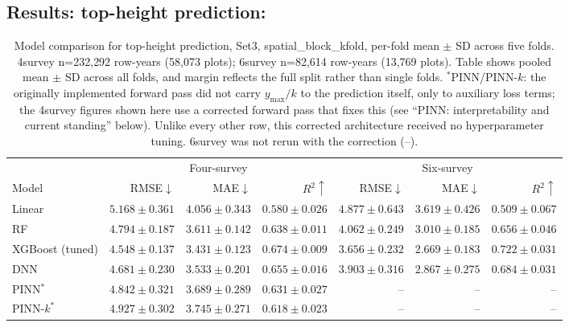 \documentclass[logo,msc,ai]{infthesis}           %
\begin{document}
\subsection{Results: top-height prediction:}
\begin{table}[!htbp]
\centering
\scriptsize
\setlength{\tabcolsep}{4pt}
\renewcommand{\arraystretch}{1.2}
\begin{tabular}{lrrrrrr}
\toprule
& \multicolumn{3}{c}{Four-survey} & \multicolumn{3}{c}{Six-survey} \\
\cmidrule(lr){2-4} \cmidrule(lr){5-7}
Model & RMSE${\downarrow}$ & MAE${\downarrow}$ & $R^2{\uparrow}$ & RMSE${\downarrow}$ & MAE${\downarrow}$ & $R^2{\uparrow}$ \\
\midrule
Linear & $5.168{\pm}0.361$ & $4.056{\pm}0.343$ & $0.580{\pm}0.026$ & $4.877{\pm}0.643$ & $3.619{\pm}0.426$ & $0.509{\pm}0.067$ \\
RF & $4.794{\pm}0.187$ & $3.611{\pm}0.142$ & $0.638{\pm}0.011$ & $4.062{\pm}0.249$ & $3.010{\pm}0.185$ & $0.656{\pm}0.046$ \\
XGBoost (tuned) & $\mathbf{4.548{\pm}0.137}$ & $\mathbf{3.431{\pm}0.123}$ & $\mathbf{0.674{\pm}0.009}$ & $\mathbf{3.656{\pm}0.232}$ & $\mathbf{2.669{\pm}0.183}$ & $\mathbf{0.722{\pm}0.031}$ \\
DNN & $4.681{\pm}0.230$ & $3.533{\pm}0.201$ & $0.655{\pm}0.016$ & $3.903{\pm}0.316$ & $2.867{\pm}0.275$ & $0.684{\pm}0.031$ \\
PINN$^*$ & $4.842{\pm}0.321$ & $3.689{\pm}0.289$ & $0.631{\pm}0.027$ & -- & -- & -- \\
PINN-$k^*$ & $4.927{\pm}0.302$ & $3.745{\pm}0.271$ & $0.618{\pm}0.023$ & -- & -- & -- \\
\bottomrule
\end{tabular}
\caption{\small{Model comparison for top-height prediction, Set3, spatial\_block\_kfold,
per-fold mean $\pm$ SD across five folds. 4survey n=232{,}292 row-years (58{,}073
plots); 6survey n=82{,}614 row-years (13{,}769 plots). Table shows pooled mean $\pm$ SD across all folds, and margin reflects the full split rather than single folds.
$^*$PINN/PINN-$k$: the originally implemented forward pass did not carry
$y_{\max}/k$ to the prediction itself, only to auxiliary loss terms; the
4survey figures shown here use a corrected forward pass that fixes this (see
``PINN: interpretability and current standing'' below). Unlike every other
row, this corrected architecture received no hyperparameter tuning. 6survey
was not rerun with the correction (--).}}
\label{tab:results-rq1}
\end{table}
\end{document}
